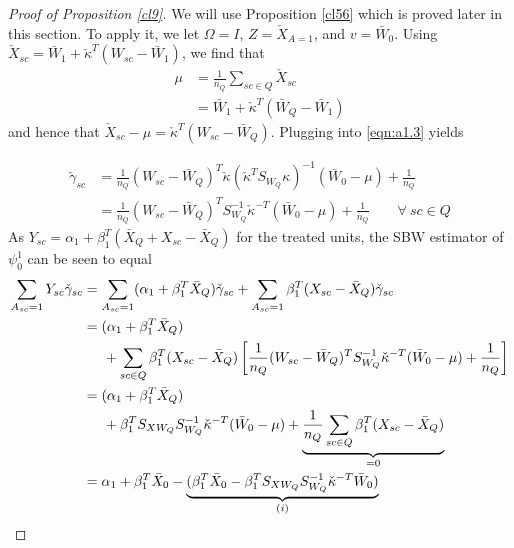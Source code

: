 \documentclass[aoas]{imsart}
\theoremstyle{plain}
\theoremstyle{remark}
\begin{document}
\begin{appendix}
\begin{proof}[Proof of Proposition \ref{cl9}]

We will use Proposition \ref{cl56} which is proved later in this section. To apply it, we let $\Omega = I$, $Z = \check{X}_{A=1}$, and $v = \bar{W}_0$. Using  $\check{X}_{sc} = \bar{W}_1 + \check{\kappa}^T(W_{sc} - \bar{W}_1)$, we find that 
\begin{align}
    \nonumber \mu & = \frac{1}{n_Q} \sum_{sc \in Q} \check{X}_{sc} \\
    \label{eqn:cl9.mu} & = \bar{W}_1 + \check{\kappa}^T(\bar{W}_Q - \bar{W}_1)
\end{align}
and hence that $\check{X}_{sc} - \mu = \check{\kappa}^T(W_{sc} - \bar{W}_Q)$. Plugging into \eqref{eqn:a1.3} yields 

\begin{align}
 \nonumber \check{\gamma}_{sc} & = \frac{1}{n_Q}(W_{sc} - \bar{W}_Q)^T \check{\kappa} (\check{\kappa}^T S_{W_Q} \kappa)^{-1}(\bar{W}_0 - \mu) + \frac{1}{n_Q} \\
 \label{eqn:cl9.proof.gamma}& = \frac{1}{n_Q}(W_{sc} - \bar{W}_Q)^T S_{W_Q}^{-1} \check{\kappa}^{-T}(\bar{W}_0 - \mu) + \frac{1}{n_Q} \qquad \forall \ sc \in Q
\end{align}
As $Y_{sc} = \alpha_1 + \beta_1^T (\bar{X}_Q + X_{sc} - \bar{X}_Q)$ for the treated units, the SBW estimator of $\psi_0^1$ can be seen to equal
\begin{align}
    \nonumber \sum_{A_{sc}=1} Y_{sc}\check{\gamma}_{sc} & = \sum_{A_{sc}=1} (\alpha_1 + \beta_1^T \bar{X}_Q) \check{\gamma}_{sc} + \sum_{A_{sc}=1}  \beta_1^T (X_{sc} - \bar{X}_Q)\check{\gamma}_{sc} \\
 \label{eqn:cl9.proof1}    & = (\alpha_1 + \beta_1^T \bar{X}_Q)\\
    \nonumber & \hskip.5cm {} + \sum_{sc \in Q}  \beta_1^T(X_{sc} - \bar{X}_Q)\left[\frac{1}{n_Q} (W_{sc} - \bar{W}_Q)^T S_{W_Q}^{-1} \check{\kappa}^{-T}(\bar{W}_0 - \mu) +  \frac{1}{n_Q}\right] \\
\label{eqn:cl9.proof2}    & = (\alpha_1 + \beta_1^T \bar{X}_Q)\\
    \nonumber & \hskip.5cm {} +  \beta_1^TS_{XW_Q} S_{W_Q}^{-1} \check{\kappa}^{-T}(\bar{W}_0 - \mu) + \underbrace{\frac{1}{n_Q}\sum_{sc \in Q}   \beta_1^T (X_{sc} - \bar{X}_Q) }_{= 0} \\ 
\label{eqn:cl9.proof3}    & = \alpha_1 + \beta_1^T \bar{X}_0 - \underbrace{(\beta_1^T \bar{X}_0 -  \beta_1^TS_{XW_Q} S_{W_Q}^{-1} \check{\kappa}^{-T}\bar{W}_0)}_{(i)} \\

\end{align}
\end{proof}
\end{appendix}
\end{document}
